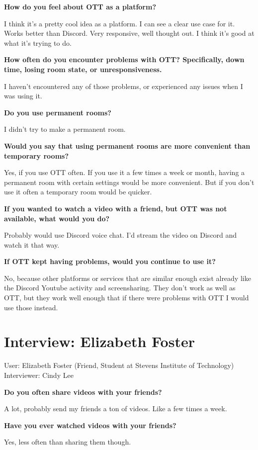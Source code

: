 \textbf{How do you feel about OTT as a platform?}

I think it's a pretty cool idea as a platform. I can see a clear use case for it. Works better than Discord. Very responsive, well thought out. I think it's good at what it's trying to do.

\textbf{How often do you encounter problems with OTT? Specifically, down time, losing room state, or unresponsiveness.}

I haven't encountered any of those problems, or experienced any issues when I was using it.

\textbf{Do you use permanent rooms?}

I didn't try to make a permanent room.

\textbf{Would you say that using permanent rooms are more convenient than temporary rooms?}

Yes, if you use OTT often. If you use it a few times a week or month, having a permanent room with certain settings would be more convenient. But if you don't use it often a temporary room would be quicker.

\textbf{If you wanted to watch a video with a friend, but OTT was not available, what would you do?}

Probably would use Discord voice chat. I'd stream the video on Discord and watch it that way.

\textbf{If OTT kept having problems, would you continue to use it?}

No, because other platforms or services that are similar enough exist already like the Discord Youtube activity and screensharing. They don't work as well as OTT, but they work well enough that if there were problems with OTT I would use those instead.

\section{Interview: Elizabeth Foster}

User: Elizabeth Foster (Friend, Student at Stevens Institute of Technology) \\
Interviewer: Cindy Lee

\textbf{Do you often share videos with your friends?}

A lot, probably send my friends a ton of videos. Like a few times a week.

\textbf{Have you ever watched videos with your friends?}

Yes, less often than sharing them though.

